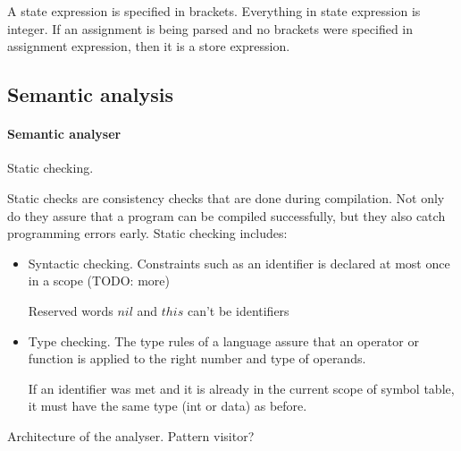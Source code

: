 A state expression is specified in brackets. Everything in state expression is integer.
If an assignment is being parsed and no brackets were specified in assignment expression, then it is a store expression.


\subsection{Semantic analysis}
  \paragraph{Semantic analyser}
Static checking.

Static checks are consistency checks that are done during compilation. Not only do they assure that a program can be compiled successfully, but they also catch programming errors early. Static checking includes:
\begin{itemize}
\item Syntactic checking. Constraints such as an identifier is declared at most once in a scope (TODO: more)

Reserved words $nil$ and $this$ can't be identifiers

\item Type checking. The type rules of a language assure that an operator or function is applied to the right number and type of operands.

If an identifier was met and it is already in the current scope of symbol table, it must have the same type (int or data) as before.
\end{itemize}

 Architecture of the analyser. Pattern visitor?


